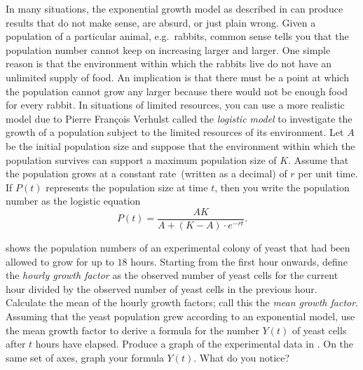 \documentclass[a4paper,oneside,12pt]{article}
\begin{document}
\begin{problem}
\begin{table}[!htbp]
\centering

\caption{%
  The observed population size in an experimental colony of yeast.
  The data are due to T.~Carlson, published in~1913.  The column for
  hours lists the numbers of hours that the population had been
  allowed to grow.  The column for observed numbers lists the counts
  of the number of yeast cells that were found in the colony after a
  given number of hours.
}
\label{tab:yeast}
\end{table}

\item In many situations, the exponential growth model as described
  in  can produce results that do not
  make sense, are absurd, or just plain wrong.  Given a population of
  a particular animal, e.g.~rabbits, common sense tells you that the
  population number cannot keep on increasing larger and larger.  One
  simple reason is that the environment within which the rabbits live
  do not have an unlimited supply of food.  An implication is that
  there must be a point at which the population cannot grow any larger
  because there would not be enough food for every rabbit.  In
  situations of limited resources, you can use a more realistic model
  due to Pierre Fran\c{c}ois Verhulst called the \emph{logistic model}
  to investigate the growth of a population subject to the limited
  resources of its environment.  Let $A$ be the initial population
  size and suppose that the environment within which the population
  survives can support a maximum population size of $K$.  Assume that
  the population grows at a constant rate~(written as a decimal) of
  $r$ per unit time.  If $P(t)$ represents the population size at time
  $t$, then you write the population number as the logistic equation
  \begin{equation}
  \label{eqn:logistic_equation}
  P(t)
  =
  \frac{
    AK
  }{
    A + (K - A) \cdot e^{-rt}
  }.
  \end{equation}
  \begin{packedenum}
  \item\label{subprob:yeast_data_mean_growth_factor}
     shows the population numbers of an experimental
    colony of yeast that had been allowed to grow for up to $18$
    hours.  Starting from the first hour onwards, define the
    \emph{hourly growth factor} as the observed number of yeast cells
    for the current hour divided by the observed number of yeast cells
    in the previous hour.  Calculate the mean of the hourly growth
    factors; call this the \emph{mean growth factor}.  Assuming that
    the yeast population grew according to an exponential model, use
    the mean growth factor to derive a formula for the number $Y(t)$
    of yeast cells after $t$ hours have elapsed.  Produce a graph of
    the experimental data in .  On the same set of
    axes, graph your formula $Y(t)$.  What do you notice?


\end{packedenum}
\end{problem}
\end{document}
